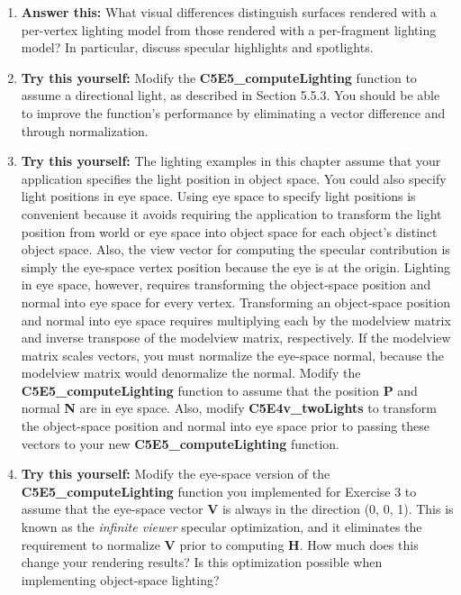\documentclass[../main.tex]{subfiles}
\begin{document}
\begin{enumerate}

\item \textbf{Answer this:} What visual differences distinguish surfaces rendered with a per-vertex lighting model from those rendered with a per-fragment lighting model? In particular, discuss specular highlights and spotlights.

\item \textbf{Try this yourself:} Modify the \textbf{C5E5_computeLighting} function to assume a directional light, as described in Section 5.5.3. You should be able to improve the function's performance by eliminating a vector difference and through normalization.

\item \textbf{Try this yourself:} The lighting examples in this chapter assume that your application specifies the light position in object space. You could also specify light positions in eye space. Using eye space to specify light positions is convenient because it avoids requiring the application to transform the light position from world or eye space into object space for each object's distinct object space. Also, the view vector for computing the specular contribution is simply the eye-space vertex position because the eye is at the origin. Lighting in eye space, however, requires transforming the object-space position and normal into eye space for every vertex. Transforming an object-space position and normal into eye space requires multiplying each by the modelview matrix and inverse transpose of the modelview matrix, respectively. If the modelview matrix scales vectors, you must normalize the eye-space normal, because the modelview matrix would denormalize the normal. Modify the \textbf{C5E5_computeLighting} function to assume that the position \textbf{P} and normal \textbf{N} are in eye space. Also, modify \textbf{C5E4v_twoLights} to transform the object-space position and normal into eye space prior to passing these vectors to your new \textbf{C5E5_computeLighting} function.

\item \textbf{Try this yourself:} Modify the eye-space version of the \textbf{C5E5_computeLighting} function you implemented for Exercise 3 to assume that the eye-space vector \textbf{V} is always in the direction (0, 0, 1). This is known as the \textit{infinite viewer} specular optimization, and it eliminates the requirement to normalize \textbf{V} prior to computing \textbf{H}. How much does this change your rendering results? Is this optimization possible when implementing object-space lighting?


\end{enumerate}
\end{document}
